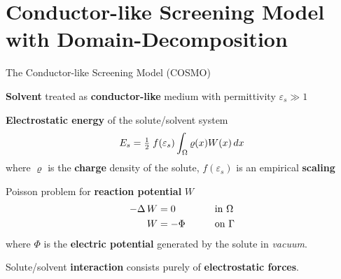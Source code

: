 \section{\bf Conductor-like Screening Model with Domain-Decomposition}
\begin{frame}{The Conductor-like Screening Model (COSMO)}

%


\begin{wideitemize}
\item {\bf Solvent} treated as {\bf conductor-like} medium with permittivity $\varepsilon_s \gg 1$
\item {\bf Electrostatic energy} of the solute/solvent system
\begin{align*}
E_s =\tfrac{1}{2} \;  f(\varepsilon_s)  \int_{\Omega}\varrho(x) W(x)\, dx \displaybump
\end{align*}
where $\varrho$ is the {\bf charge} density of the solute, $f(\varepsilon_s)$ is an empirical {\bf scaling}
\medskip
\item Poisson problem for {\bf reaction potential} $W$
\begin{alignat*}{3}
-\Delta \, W &= 0 &&\text{in } \Omega \displaybump \\
W &=-\Phi \qquad &&\text{on }\Gamma
\end{alignat*}
where $\Phi$ is the {\bf electric potential} generated by the solute in \emph{vacuum}.
\item Solute/solvent {\bf interaction} consists purely of {\bf electrostatic forces}.
\end{wideitemize}

\end{frame}


